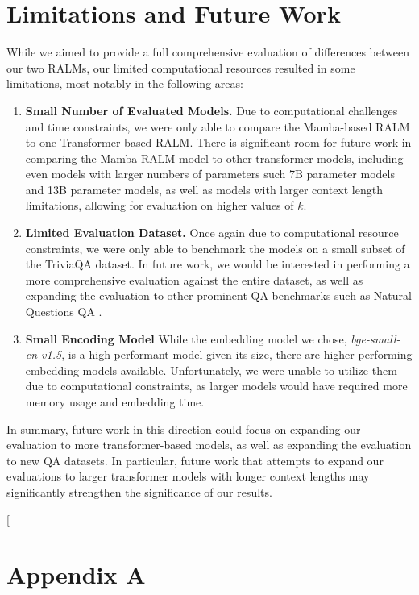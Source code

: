 \documentclass[11pt]{article}
\begin{document}
\section{Limitations and Future Work}
While we aimed to provide a full comprehensive evaluation of differences between our two RALMs, our limited computational resources resulted in some limitations, most notably in the following areas:
\begin{enumerate}
    \item \textbf{Small Number of Evaluated Models.} Due to computational challenges and time constraints, we were only able to compare the Mamba-based RALM to one Transformer-based RALM. There is significant room for future work in comparing the Mamba RALM model to other transformer models, including even models with larger numbers of parameters such 7B parameter models and 13B parameter models, as well as models with larger context length limitations, allowing for evaluation on higher values of $k$.
    \item \textbf{Limited Evaluation Dataset.} Once again due to computational resource constraints, we were only able to benchmark the models on a small subset of the TriviaQA dataset. In future work, we would be interested in performing a more comprehensive evaluation against the entire dataset, as well as expanding the evaluation to other prominent QA benchmarks such as Natural Questions QA \cite{kwiatkowski-etal-2019-natural}.
    \item \textbf{Small Encoding Model} While the embedding model we chose, \textit{bge-small-en-v1.5}, is a high performant model given its size, there are higher performing embedding models available. Unfortunately, we were unable to utilize them due to computational constraints, as larger models would have required more memory usage and embedding time.
\end{enumerate}
In summary, future work in this direction could focus on expanding our evaluation to more transformer-based models, as well as expanding the evaluation to new QA datasets. In particular, future work that attempts to expand our evaluations to larger transformer models with longer context lengths may significantly strengthen the significance of our results.
\clearpage


\clearpage
\twocolumn[
\section*{Appendix A}
\appendix{}
\end{document}
